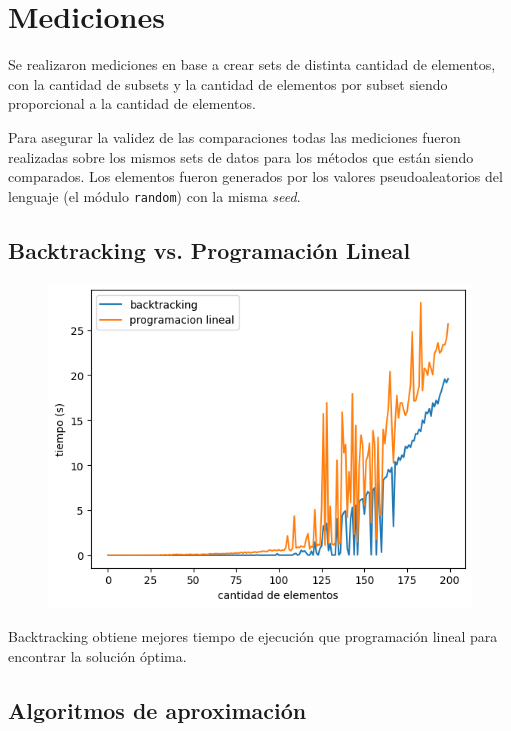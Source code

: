 \section{Mediciones}

Se realizaron mediciones en base a crear sets de distinta cantidad de
elementos, con la cantidad de subsets y la cantidad de elementos por subset
siendo proporcional a la cantidad de elementos.

Para asegurar la validez de las comparaciones todas las mediciones fueron
realizadas sobre los mismos sets de datos para los métodos que están siendo
comparados. Los elementos fueron generados por los valores pseudoaleatorios del
lenguaje (el módulo \texttt{random}) con la misma \textit{seed}.

\subsection{Backtracking vs. Programación Lineal}

\begin{figure}[H]
    \centering
    \includegraphics[width=1\textwidth]{img/backvslp.png}
\end{figure}

Backtracking obtiene mejores tiempo de ejecución que programación lineal para
encontrar la solución óptima.

\subsection{Algoritmos de aproximación}

